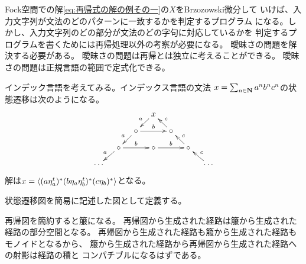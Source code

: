 	Fock空間での解\eqref{eq:再帰式の解の例その一}の$X$をBrzozowski微分して
	いけば、入力文字列が文法のどのパターンに一致するかを判定するプログラム
	になる。しかし、入力文字列のどの部分が文法のどの字句に対応しているかを
	判定するプログラムを書くためには再帰処理以外の考察が必要になる。
	曖昧さの問題を解決する必要がある。
	曖昧さの問題は再帰とは独立に考えることができる。
	曖昧さの問題は正規言語の範囲で定式化できる。

	インデック言語を考えてみる。インデックス言語の文法
	$x=\sum_{n\in{\ensuremath{\mathbf{N}}}}a^nb^nc^n$の状態遷移は次のようになる。
	\begin{equation*}\xymatrix@R=1em@C=1em{
		& & & x \ar[dl]_a \\
		& & \ar[dl]_a \circ \ar[rr]^b & & \circ \ar[ul]_c \\
		& \circ \ar[dl]_a \ar[rr]^b & & \circ \ar[rr]^b & & \circ \ar[ul]_c \\
		\cdots & & & & & & \cdots \ar[ul]_c \\
	}\end{equation*}
	解は$x=\mathinner{\langle{(a\eta_a^t)^*(b\eta_a\eta_b^t)^*(c\eta_b)^*}\rangle}$となる。

	\begin{description}\setlength{\itemsep}{-1mm} %
		\item[再帰図の定義] 状態遷移図を簡易に記述した図として定義する。
		\item[再帰図と箙の関係] 再帰図を簡約すると箙になる。
		再帰図から生成された経路は箙から生成された経路の部分空間となる。
		再帰図から生成された経路も箙から生成された経路もモノイドとなるから、
		箙から生成された経路から再帰図から生成された経路への射影は経路の積と
		コンパチブルになるはずである。
	\end{description} %

